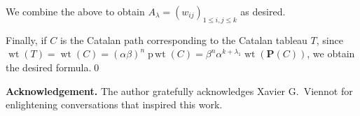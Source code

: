 \documentclass[11pt]{article}
\numberwithin{equation}{section}
\theoremstyle{plain}
\theoremstyle{definition}
\theoremstyle{remark}
\DeclareMathOperator{\wt}{wt}
\DeclareMathOperator{\pwt}{p\,wt}
\begin{document}
We combine the above to obtain $A_{\lambda} = \left(w_{ij}\right)_{1 \leq i,j \leq k}$ as desired.

Finally, if $C$ is the Catalan path corresponding to the Catalan tableau $T$, since $\wt(T)= \wt(C) = (\alpha\beta)^n \pwt(C) = \beta^n\alpha^{k+\lambda_1} \wt(\textbf{P}(C))$, we obtain the desired formula.\qed

\noindent \textbf{Acknowledgement.} The author gratefully acknowledges Xavier G.~Viennot for enlightening conversations that inspired this work.








\end{document}
